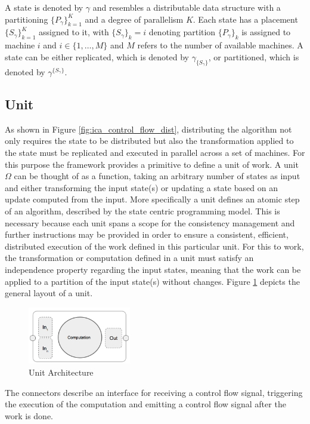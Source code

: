 \begin{definition}
A state is denoted by $\gamma$ and resembles a distributable data structure with a partitioning $\{P_\gamma\}_{k=1}^K$ and a degree of parallelism $K$.
Each state has a placement $\{S_\gamma\}_{k=1}^K$ assigned to it, with $\{S_\gamma\}_k = i$ denoting partition $\{P_\gamma\}_k$ is assigned to machine $i$ and $i \in \{1, \ldots, M\}$ and $M$ refers to the number of available machines.
A state can be either replicated, which is denoted by $\gamma_{\{S_\gamma\}}$, or partitioned, which is denoted by $\gamma^{\{S_\gamma\}}$.
\end{definition}

\subsection{Unit}
\label{ss:unit}
As shown in Figure \ref{fig:ica_control_flow_dist}, distributing the algorithm not only requires the state to be distributed but also the transformation applied to the state must be replicated and executed in parallel across a set of machines.
For this purpose the framework provides a primitive to define a unit of work.
A unit $\Omega$ can be thought of as a function, taking an arbitrary number of states as input and either transforming the input state(s) or updating a state based on an update computed from the input.
More specifically a unit defines an atomic step of an algorithm, described by the state centric programming model.
This is necessary because each unit spans a scope for the consistency management and further instructions may be provided in order to ensure a consistent, efficient, distributed execution of the work defined in this particular unit.
For this to work, the transformation or computation defined in a unit must satisfy an independence property regarding the input states, meaning that the work can be applied to a partition of the input state(s) without changes.
Figure \ref{fig:unit} depicts the general layout of a unit.
\begin{figure}[ht]
\centering
\includegraphics[width=0.4\textwidth]{img/unit.png}
\caption{Unit Architecture}
\label{fig:unit}
\end{figure}
The connectors describe an interface for receiving a control flow signal, triggering the execution of the computation and emitting a control flow signal after the work is done.

